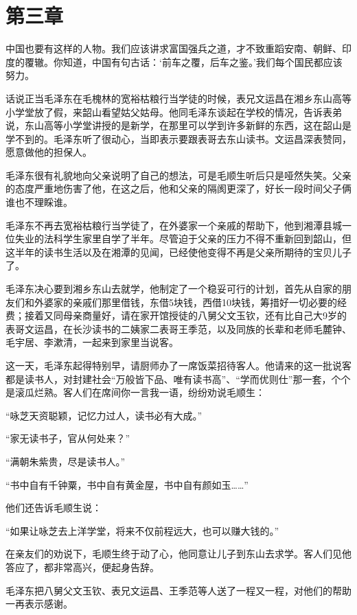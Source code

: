 \documentclass[../../dazhuan.tex]{subfiles}
\begin{document}
\chapter*{第三章}

\begin{pref}
中国也要有这样的人物。我们应该讲求富国强兵之道，才不致重蹈安南、朝鲜、印度的覆辙。你知道，中国有句古话：‘前车之覆，后车之鉴。’我们每个国民都应该努力。
\end{pref}

话说正当毛泽东在毛槐林的宽裕枯粮行当学徒的时候，表兄文运昌在湘乡东山高等小学堂放了假，来韶山看望姑父姑母。他同毛泽东谈起在学校的情况，告诉表弟说，东山高等小学堂讲授的是新学，在那里可以学到许多新鲜的东西，这在韶山是学不到的。毛泽东听了很动心，当即表示要跟表哥去东山读书。文运昌深表赞同，愿意做他的担保人。

毛泽东很有礼貌地向父亲说明了自己的想法，可是毛顺生听后只是哑然失笑。父亲的态度严重地伤害了他，在这之后，他和父亲的隔阂更深了，好长一段时间父子俩谁也不理睬谁。

毛泽东不再去宽裕枯粮行当学徒了，在外婆家一个亲戚的帮助下，他到湘潭县城一位失业的法科学生家里自学了半年。尽管迫于父亲的压力不得不重新回到韶山，但这半年的读书生活以及在湘潭的见闻，已经使他变得不再是父亲所期待的宝贝儿子了。

毛泽东决心要到湘乡东山去就学，他制定了一个稳妥可行的计划，首先从自家的朋友们和外婆家的亲戚们那里借钱，东借5块钱，西借10块钱，筹措好一切必要的经费；接着又同母亲商量好，请在家开馆授徒的八舅父文玉钦，还有比自己大9岁的表哥文运昌，在长沙读书的二姨家二表哥王季范，以及同族的长辈和老师毛麓钟、毛宇居、李漱清，一起来到家里当说客。

这一天，毛泽东起得特别早，请厨师办了一席饭菜招待客人。他请来的这一批说客都是读书人，对封建社会“万般皆下品、唯有读书高”、“学而优则仕”那一套，个个是滚瓜烂熟。客人们在席间你一言我一语，纷纷劝说毛顺生：

“咏芝天资聪颖，记忆力过人，读书必有大成。”

“家无读书子，官从何处来？”

“满朝朱紫贵，尽是读书人。”

“书中自有千钟粟，书中自有黄金屋，书中自有颜如玉……”

他们还告诉毛顺生说：

“如果让咏芝去上洋学堂，将来不仅前程远大，也可以赚大钱的。”

在亲友们的劝说下，毛顺生终于动了心，他同意让儿子到东山去求学。客人们见他答应了，都非常高兴，便起身告辞。

毛泽东把八舅父文玉钦、表兄文运昌、王季范等人送了一程又一程，对他们的帮助一再表示感谢。
\end{document}
